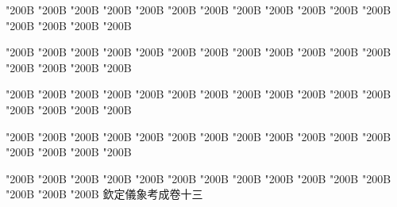 \begin{正文}
\char"200B\relax{}
\char"200B\relax{}
\char"200B\relax{}
\char"200B\relax{}
\char"200B\relax{}
\char"200B\relax{}
\char"200B\relax{}
\char"200B\relax{}
\char"200B\relax{}
\char"200B\relax{}
\char"200B\relax{}
\char"200B\relax{}
\char"200B\relax{}
\char"200B\relax{}
\char"200B\relax{}
\char"200B\relax
{}\par
\end{正文}\clearpage
{}
\begin{正文}
\char"200B\relax{}
\char"200B\relax{}
\char"200B\relax{}
\char"200B\relax{}
\char"200B\relax{}
\char"200B\relax{}
\char"200B\relax{}
\char"200B\relax{}
\char"200B\relax{}
\char"200B\relax{}
\char"200B\relax{}
\char"200B\relax{}
\char"200B\relax{}
\char"200B\relax{}
\char"200B\relax{}
\char"200B\relax
{}\par
\end{正文}\clearpage
{}
\begin{正文}
\char"200B\relax{}
\char"200B\relax{}
\char"200B\relax{}
\char"200B\relax{}
\char"200B\relax{}
\char"200B\relax{}
\char"200B\relax{}
\char"200B\relax{}
\char"200B\relax{}
\char"200B\relax{}
\char"200B\relax{}
\char"200B\relax{}
\char"200B\relax{}
\char"200B\relax{}
\char"200B\relax{}
\char"200B\relax
{}\par
\end{正文}\clearpage
{}
\begin{正文}
\char"200B\relax{}
\char"200B\relax{}
\char"200B\relax{}
\char"200B\relax{}
\char"200B\relax{}
\char"200B\relax{}
\char"200B\relax{}
\char"200B\relax{}
\char"200B\relax{}
\char"200B\relax{}
\char"200B\relax{}
\char"200B\relax{}
\char"200B\relax{}
\char"200B\relax{}
\char"200B\relax{}
\char"200B\relax
{}\par
\end{正文}\clearpage
{}
\begin{正文}
\char"200B\relax{}
\char"200B\relax{}
\char"200B\relax{}
\char"200B\relax{}
\char"200B\relax{}
\char"200B\relax{}
\char"200B\relax{}
\char"200B\relax{}
\char"200B\relax{}
\char"200B\relax{}
\char"200B\relax{}
\char"200B\relax{}
\char"200B\relax{}
\char"200B\relax{}
\char"200B\relax{}
欽定儀象考成卷十三
\par

\par\end{正文}\clearpage
